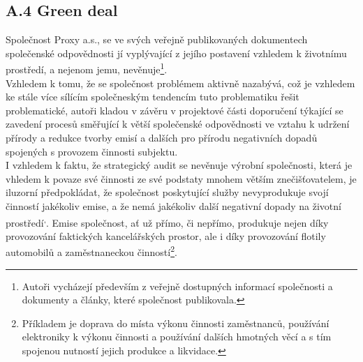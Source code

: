 \subsection*{A.4 Green deal}
\label{sec:Green deal}

Společnost Proxy a.s., se ve svých veřejně publikovaných dokumentech společenské odpovědnosti jí vyplývající z jejího postavení vzhledem k životnímu prostředí, a nejenom jemu, nevěnuje\footnote{Autoři vycházejí především z veřejně dostupných informací společnosti a dokumenty a články, které společnost publikovala.}.\\


Vzhledem k tomu, že se společnost problémem aktivně nazabývá, což je vzhledem ke stále více sílícím společneským tendencím tuto problematiku řešit problematické, autoři kladou v závěru v projektové části doporučení týkající se zavedení procesů směřující k větší společenské odpovědnosti ve vztahu k udržení přírody a redukce tvorby emisí a dalších pro přírodu negativních dopadů spojených s provozem činnosti subjektu.\\

I vzhledem k faktu, že strategický audit se nevěnuje výrobní společnosti, která je vhledem k povaze své činnosti ze své podstaty mnohem větším znečišťovatelem, je iluzorní předpokládat, že společnost poskytující služby nevyprodukuje svojí činností jakékoliv emise, a že nemá jakékoliv další negativní dopady na životní prostředí\textsuperscript{,}. Emise společnost, ať už přímo, či nepřímo, produkuje nejen díky provozování faktických kancelářských prostor, ale i díky provozování flotily automobilů a zaměstnaneckou činností\footnote{Příkladem je doprava do místa výkonu činnosti zaměstnanců, používání elektroniky k výkonu činnosti a používání dalších hmotných věcí a s tím spojenou nutností jejich produkce a likvidace.}. 





